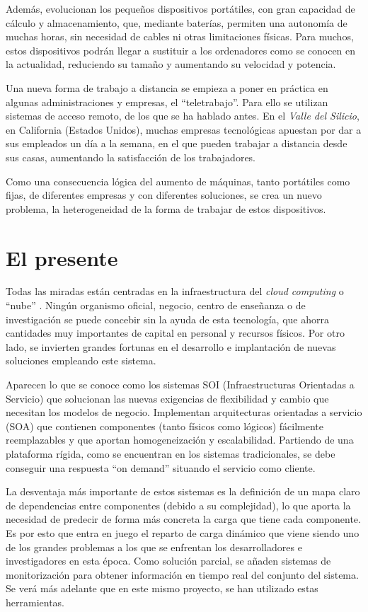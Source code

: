 Además, evolucionan los pequeños dispositivos portátiles, con gran 
capacidad de cálculo y almacenamiento, que, mediante baterías, permiten 
una autonomía de muchas horas, sin necesidad de cables ni otras 
limitaciones físicas. Para muchos, estos dispositivos podrán llegar a 
sustituir a los ordenadores como se conocen en la actualidad, 
reduciendo su tamaño y aumentando su velocidad y potencia.

Una nueva forma de trabajo a distancia se empieza a poner en práctica 
en algunas administraciones y empresas, el ``teletrabajo''. Para ello 
se utilizan sistemas de acceso remoto, de los que se ha hablado antes. 
En el \emph{Valle del Silicio}, en California (Estados Unidos), muchas 
empresas tecnológicas apuestan por dar a sus empleados un día a la 
semana, en el que pueden trabajar a distancia desde sus casas, aumentando 
la satisfacción de los trabajadores.

Como una consecuencia lógica del aumento de máquinas, tanto 
portátiles como fijas, de diferentes empresas y con diferentes 
soluciones, se crea un nuevo problema, la heterogeneidad de la forma 
de trabajar de estos dispositivos.

\section{El presente}
\label{sec:presente}

Todas las miradas están centradas en la infraestructura del 
\emph{cloud computing}  o 
``nube'' . Ningún 
organismo oficial, negocio, centro de enseñanza o de investigación se 
puede concebir sin la ayuda de esta tecnología, que ahorra cantidades 
muy importantes de capital en personal y recursos físicos. Por otro 
lado, se invierten grandes fortunas en el desarrollo e implantación de 
nuevas soluciones empleando este sistema.

Aparecen lo que se conoce como los sistemas SOI (Infraestructuras 
Orientadas a Servicio) que solucionan las nuevas exigencias de 
flexibilidad y cambio que necesitan los modelos de negocio. 
Implementan arquitecturas orientadas a servicio (SOA) que contienen 
componentes (tanto físicos como lógicos) fácilmente reemplazables y 
que aportan homogeneización y escalabilidad. Partiendo de una 
plataforma rígida, como se encuentran en los sistemas tradicionales, 
se debe conseguir una respuesta ``on demand'' situando el servicio 
como cliente.

La desventaja más importante de estos sistemas es la definición de un mapa 
claro de dependencias entre componentes (debido a su complejidad), lo 
que aporta la necesidad de predecir de forma más concreta la carga que 
tiene cada componente. Es por esto que entra en juego el reparto de 
carga dinámico que viene siendo uno de los grandes problemas a los que 
se enfrentan los desarrolladores e investigadores en esta época. Como 
solución parcial, se añaden sistemas de monitorización para obtener 
información en tiempo real del conjunto del sistema. Se verá más 
adelante que en este mismo proyecto, se han utilizado estas 
herramientas.

